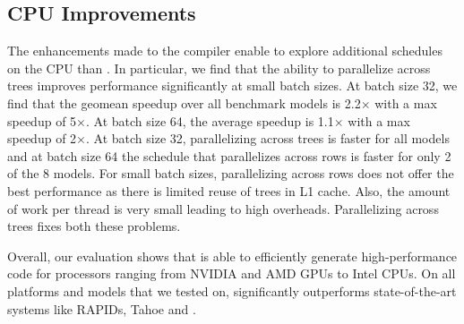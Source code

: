 \subsection{CPU Improvements}
The enhancements made to the compiler enable \Treebeard{} to explore additional schedules on the CPU
than \TreebeardOLD{}. 
In particular, we find that the ability to parallelize across trees improves performance 
significantly at small batch sizes. At batch size 32, we find that the geomean speedup over 
all benchmark models is 2.2$\times$ with a max speedup of 5$\times$. At batch size 64, the average speedup
is 1.1$\times$ with a max speedup of 2$\times$. At batch size 32, parallelizing across trees is faster 
for all models and at batch size 64 the \TreebeardOLD{} schedule that parallelizes across 
rows is faster for only 2 of the 8 models. For small batch sizes, parallelizing across rows does 
not offer the best performance as there is limited reuse of trees in L1 cache.
Also, the amount of work per thread is very small leading to high overheads. 
Parallelizing across trees fixes both these problems. 


Overall, our evaluation shows that \Treebeard{} is able to efficiently generate 
high-performance code for processors ranging from NVIDIA and AMD GPUs to Intel CPUs.
On all platforms and models that we tested on, \Treebeard{} significantly outperforms
state-of-the-art systems like RAPIDs, Tahoe and \TreebeardOLD{}.